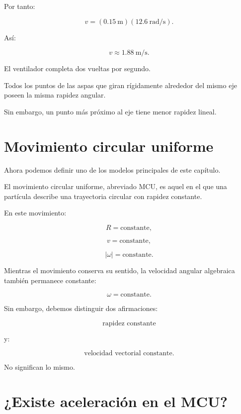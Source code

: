 Por tanto:

\[
v
=
(\SI{0.15}{\meter})
(\SI{12.6}{\radian\per\second}).
\]

Así:

\[
\boxed{
v\approx
\SI{1.88}{\meter\per\second}
}.
\]

\begin{interpretacion}

El ventilador completa dos vueltas por segundo.

Todos los puntos de las aspas que giran rígidamente alrededor del mismo eje
poseen la misma rapidez angular.

Sin embargo, un punto más próximo al eje tiene menor rapidez lineal.

\end{interpretacion}


\section{Movimiento circular uniforme}

Ahora podemos definir uno de los modelos principales de este capítulo.

\begin{definicion}

El movimiento circular uniforme, abreviado MCU, es aquel en el que una
partícula describe una trayectoria circular con rapidez constante.

\end{definicion}

En este movimiento:

\[
R=\text{constante},
\]

\[
v=\text{constante},
\]

\[
|\omega|=\text{constante}.
\]

Mientras el movimiento conserva su sentido, la velocidad angular algebraica
también permanece constante:

\[
\omega=\text{constante}.
\]

Sin embargo, debemos distinguir dos afirmaciones:

\[
\text{rapidez constante}
\]

y:

\[
\text{velocidad vectorial constante}.
\]

No significan lo mismo.


\section{¿Existe aceleración en el MCU?}

